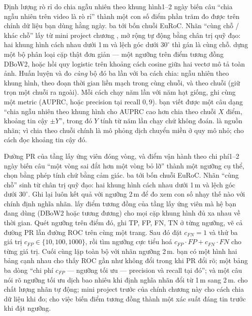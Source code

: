 \documentclass[../../deep_learning.tex]{subfiles}
\begin{document}
\begin{duan}{Định lượng rò rỉ do chia ngẫu nhiên theo khung hình}{1--2 ngày}
\dmt biến câu ``chia ngẫu nhiên trên video là rò rỉ'' thành một con số điểm phần trăm đo được trên chính dữ liệu bạn dùng hằng ngày.
\ddl ba tới bốn chuỗi EuRoC. Nhãn ``cùng chỗ / khác chỗ'' lấy từ mini project chương , mở rộng tự động bằng chân trị quỹ đạo: hai khung hình cách nhau dưới 1\,m và lệch góc dưới \(30^\circ\) thì gán là cùng chỗ.
\dbc dựng một bộ phân loại cặp thật đơn giản --- một ngưỡng trên điểm tương đồng DBoW2, hoặc hồi quy logistic trên khoảng cách cosine giữa hai vectơ mô tả toàn ảnh. Huấn luyện và đo \emph{cùng} bộ đó ba lần với ba cách chia: ngẫu nhiên theo khung hình, theo đoạn thời gian liền mạch trong cùng chuỗi, và theo chuỗi (giữ trọn một chuỗi ra ngoài). Mỗi cách chạy năm lần với năm hạt giống, ghi cùng một metric (AUPRC, hoặc precision tại recall \(0{,}9\)).
\dxk bạn viết được một câu dạng ``chia ngẫu nhiên theo khung hình cho AUPRC cao hơn chia theo chuỗi \(X\) điểm, khoảng tin cậy \(\pm Y\)'', trong đó \(Y\) tính từ năm lần chạy chứ không đoán.
\dnv {} là nguồn nhãn;  vì chia theo chuỗi chính là mô phỏng dịch chuyển miền ở quy mô nhỏ;  cho cách đọc khoảng tin cậy đó.
\end{duan}

\begin{duan}{Đường PR của tầng lấy ứng viên đóng vòng, và điểm vận hành theo chi phí}{1--2 ngày}
\dmt biến câu ``một vòng sai đắt hơn một vòng bỏ lỡ'' thành một ngưỡng cụ thể, chọn bằng phép tính chứ bằng cảm giác.
\ddl ba tới bốn chuỗi EuRoC. Nhãn ``cùng chỗ'' sinh từ chân trị quỹ đạo: hai khung hình cách nhau dưới 1\,m và lệch góc dưới \(30^\circ\). Ghi lại luôn kết quả với ngưỡng 2\,m để đo xem con số nhạy thế nào với chính định nghĩa nhãn.
\dbc lấy điểm tương đồng của tầng lấy ứng viên mà hệ bạn đang dùng (DBoW2 hoặc tương đương) cho mọi cặp khung hình đủ xa nhau về thời gian. Quét ngưỡng trên điểm đó, ghi TP, FP, FN, TN ở từng ngưỡng, vẽ cả đường PR lẫn đường ROC trên cùng một trang. Sau đó đặt \(c_{FN}=1\) và thử ba giá trị \(c_{FP} \in \{10, 100, 1000\}\), rồi tìm ngưỡng cực tiểu hoá \(c_{FP}\cdot FP + c_{FN}\cdot FN\) cho từng giá trị. Cuối cùng lặp toàn bộ với nhãn ngưỡng 2\,m.
\dxk bạn có một hình hai bảng cạnh nhau cho thấy ROC gần như không đổi trong khi PR đổi rõ; một bảng ba dòng ``chi phí \(c_{FP}\) --- ngưỡng tối ưu --- precision và recall tại đó''; và một câu nói rõ ngưỡng tối ưu dịch bao nhiêu khi định nghĩa nhãn đổi từ 1\,m sang 2\,m.
\dnv {} cho chất lượng nhãn tự động; mini project trước của chính chương này cho cách chia dữ liệu khi đo;  cho việc biến điểm tương đồng thành một xác suất đáng tin trước khi đặt ngưỡng.
\end{duan}
\end{document}
